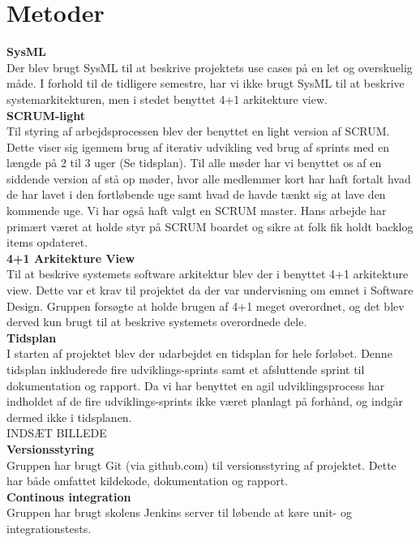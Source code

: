 \section{Metoder}

\textbf{SysML}\\
Der blev brugt SysML til at beskrive projektets use cases på en let og overskuelig måde. I forhold til de tidligere semestre, har vi ikke brugt SysML til at beskrive systemarkitekturen, men i stedet benyttet 4+1 arkitekture view.\\

\textbf{SCRUM-light}\\
Til styring af arbejdsprocessen blev der benyttet en light version af SCRUM. Dette viser sig igennem brug af iterativ udvikling ved brug af sprints med en længde på 2 til 3 uger (Se tidsplan). Til alle møder har vi benyttet os af en siddende version af stå op møder, hvor alle medlemmer kort har haft fortalt hvad de har lavet i den fortløbende uge samt hvad de havde tænkt sig at lave den kommende uge. Vi har også haft valgt en SCRUM master. Hans arbejde har primært været at holde styr på SCRUM boardet og sikre at folk fik holdt backlog items opdateret.\\

\textbf{4+1 Arkitekture View} \\
Til at beskrive systemets software arkitektur blev der i benyttet 4+1 arkitekture view. Dette var et krav til projektet da der var undervisning om emnet i Software Design. Gruppen forsøgte at holde brugen af 4+1 meget overordnet, og det blev derved kun brugt til at beskrive systemets overordnede dele. \\

\textbf{Tidsplan} \\
I starten af projektet blev der udarbejdet en tidsplan for hele forløbet. Denne tidsplan inkluderede fire udviklings-sprints samt et afsluttende sprint til dokumentation og rapport. Da vi har benyttet en agil udviklingsprocess har indholdet af de fire udviklings-sprints ikke været planlagt på forhånd, og indgår dermed ikke i tidsplanen. \\

INDSÆT BILLEDE \\

\textbf{Versionsstyring} \\
Gruppen har brugt Git (via github.com) til versionsstyring af projektet. Dette har både omfattet kildekode, dokumentation og rapport. \\

\textbf{Continous integration} \\
Gruppen har brugt skolens Jenkins server til løbende at køre unit- og integrationstests. \\
